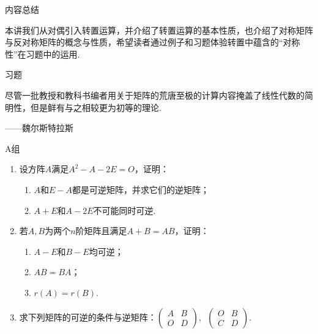 \vspace{2ex}
\centerline{\heiti \Large 内容总结}

本讲我们从对偶引入转置运算，并介绍了转置运算的基本性质，也介绍了对称矩阵与反对称矩阵的概念与性质，希望读者通过例子和习题体验转置中蕴含的``对称性''在习题中的运用.

\vspace{2ex}
\centerline{\heiti \Large 习题}

\vspace{2ex}
{\kaishu 尽管⼀批教授和教科书编者⽤关于矩阵的荒唐⾄极的计算内容掩盖了线性代数的简明性，但是鲜有与之相较更为初等的理论. }
\begin{flushright}
    \kaishu
    ——魏尔斯特拉斯
\end{flushright}

\centerline{\heiti A组}
\begin{enumerate}
    \item 设方阵$A$满足$A^2-A-2E=O$，证明：
          \begin{enumerate}
              \item $A$和$E-A$都是可逆矩阵，并求它们的逆矩阵；

              \item $A+E$和$A-2E$不可能同时可逆.
          \end{enumerate}

    \item 若$A,B$为两个$n$阶矩阵且满足$A+B=AB$，证明：
          \begin{enumerate}
              \item $A-E$和$B-E$均可逆；

              \item $AB=BA$；

              \item $r(A)=r(B)$.
          \end{enumerate}

    \item 求下列矩阵的可逆的条件与逆矩阵：$\begin{pmatrix}
            A & B \\ O & D
        \end{pmatrix},\enspace \begin{pmatrix}
            O & B \\ C & D
        \end{pmatrix}$.
\end{enumerate}

